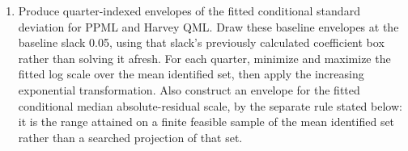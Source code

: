 \documentclass[11pt]{article}
\begin{document}
\begin{enumerate}
The associated table pages follow these inference rules. In
mean least-squares benchmark reference columns, log-OLS uses standard errors from its four-lag Bartlett analytic
covariance and Student \(t\) p-values. PPML and Harvey QML use standard errors from their four-lag
Bartlett analytic covariances and standard-normal p-values. In zero-slack
point columns, PPML and Harvey QML use the zero-slack bootstrap statistic and empirical p-value
defined in equation~\eqref{eq:tau-zero-inference}; log-OLS and LAD leave those entries blank.
Positive-slack PPML and Harvey QML mean-identified-set columns contain bootstrap confidence intervals.
The log-OLS and LAD pages have no row for a bootstrap confidence interval.
\item Produce quarter-indexed envelopes of the fitted conditional standard deviation for PPML and
Harvey QML\@. Draw these baseline envelopes at the baseline slack 0.05, using that slack's previously
calculated coefficient box rather than solving it afresh.
For each quarter, minimize and maximize the fitted log scale over the mean
identified set, then apply the increasing exponential transformation. Also construct an envelope for
the fitted conditional median absolute-residual scale, by the separate rule stated below: it is the
range attained on a finite feasible sample of the mean identified set rather than a searched
projection of that set.


\end{enumerate}
\end{document}
